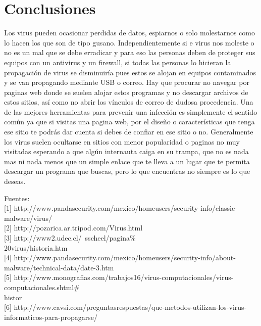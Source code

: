 \documentclass[12pt,a4paper]{article}
\begin{document}
	\section{Conclusiones}
	
	Los virus pueden ocasionar perdidas de datos, espiarnos o solo molestarnos como lo hacen los que son de tipo gusano. Independientemente si e virus nos moleste o no es un mal que se debe erradicar y para eso las personas deben de proteger sus equipos con un antivirus y un firewall, si todas las personas lo hicieran la propagación de virus se disminuiría pues estos se alojan en equipos contaminados y se van propagando mediante USB o correo. Hay que procurar no navegar por paginas web donde se suelen alojar estos programas y no descargar archivos de estos sitios, así como no abrir los vínculos de correo de dudosa procedencia. Una de las mejores herramientas para prevenir una infección es simplemente el sentido común ya que si visitas una pagina web, por el diseño o características que tenga ese sitio te podrás dar cuenta si debes de confiar en ese sitio o no. Generalmente los virus suelen ocultarse en sitios con menor popularidad o paginas no muy visitadas esperando a que algún internauta caiga en su trampa, que no es nada mas ni nada menos que un simple enlace que te lleva a un lugar que te permita descargar un programa que buscas, pero lo que encuentras no siempre es lo que deseas.
	
	Fuentes:\\
	
	[1]  http://www.pandasecurity.com/mexico/homeusers/security-info/classic-malware/virus/ \\
	
	[2]  http://pozarica.ar.tripod.com/Virus.html \\
	
	[3]  http://www2.udec.cl/~sscheel/pagina\% \\20virus/historia.htm \\
	
	[4]  http://www.pandasecurity.com/mexico/homeusers/security-info/about-malware/technical-data/date-3.htm \\
	
	[5]  http://www.monografias.com/trabajos16/virus-computacionales/virus-computacionales.shtml\# \\histor \\
	
	[6]  http://www.cavsi.com/preguntasrespuestas/que-metodos-utilizan-los-virus-informaticos-para-propagarse/ \\
	
\end{document}
